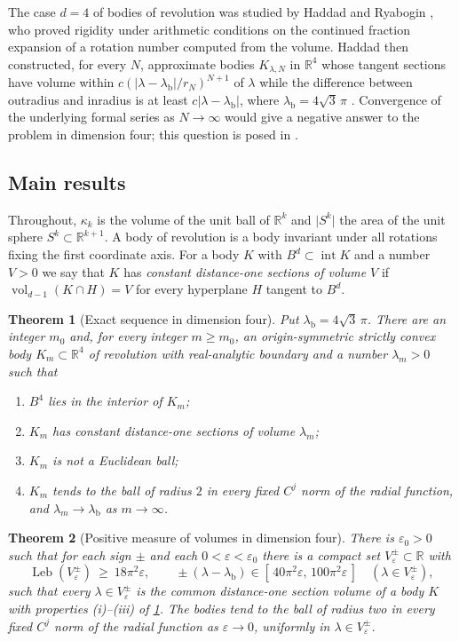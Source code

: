 \documentclass[11pt]{amsart}
\numberwithin{equation}{section}
\newtheorem{theorem}{Theorem}[section]
\theoremstyle{definition}
\theoremstyle{remark}
\newcommand{\R}{\mathbb{R}}
\newcommand{\eps}{\varepsilon}
\newcommand{\abs}[1]{\lvert #1\rvert}
\newcommand{\vol}{\operatorname{vol}}
\newcommand{\Leb}{\operatorname{Leb}}
\newcommand{\lb}{\lambda_{\mathrm b}}
\begin{document}
The case $d=4$ of bodies of revolution was studied by Haddad and Ryabogin \cite{HR}, who proved rigidity under arithmetic conditions on the continued fraction expansion of a rotation number computed from the volume. Haddad \cite{Had} then constructed, for every $N$, approximate bodies $K_{\lambda,N}$ in $\R^4$ whose tangent sections have volume within $c(\abs{\lambda-\lb}/r_N)^{N+1}$ of $\lambda$ while the difference between outradius and inradius is at least $c\abs{\lambda-\lb}$, where $\lb=4\sqrt3\,\pi$ \cite[Theorem~1]{Had}. Convergence of the underlying formal series as $N\to\infty$ would give a negative answer to the problem in dimension four; this question is posed in \cite[Section~6.1]{Had}.

\subsection{Main results}
Throughout, $\kappa_k$ is the volume of the unit ball of $\R^k$ and $\abs{S^{k}}$ the area of the unit sphere $S^k\subset\R^{k+1}$. A body of revolution is a body invariant under all rotations fixing the first coordinate axis. For a body $K$ with $B^d\subset\operatorname{int}K$ and a number $V>0$ we say that $K$ has \emph{constant distance-one sections of volume $V$} if $\vol_{d-1}(K\cap H)=V$ for every hyperplane $H$ tangent to $B^d$.

\begin{theorem}[Exact sequence in dimension four]\label{thm:d4seq}
Put $\lb=4\sqrt3\,\pi$. There are an integer $m_0$ and, for every integer $m\ge m_0$, an origin-symmetric strictly convex body $K_m\subset\R^4$ of revolution with real-analytic boundary and a number $\lambda_m>0$ such that
\begin{enumerate}[label=\textup{(\roman*)}]
\item $B^4$ lies in the interior of $K_m$;
\item $K_m$ has constant distance-one sections of volume $\lambda_m$;
\item $K_m$ is not a Euclidean ball;
\item $K_m$ tends to the ball of radius $2$ in every fixed $C^j$ norm of the radial function, and $\lambda_m\to\lb$ as $m\to\infty$.
\end{enumerate}
\end{theorem}

\begin{theorem}[Positive measure of volumes in dimension four]\label{thm:d4meas}
There is $\eps_0>0$ such that for each sign $\pm$ and each $0<\eps<\eps_0$ there is a compact set $V_\eps^{\pm}\subset\R$ with
\[
\Leb(V_\eps^{\pm})\ \ge\ 18\pi^2\eps,\qquad \pm(\lambda-\lb)\in[\,40\pi^2\eps,\,100\pi^2\eps\,]\quad(\lambda\in V_\eps^\pm),
\]
such that every $\lambda\in V_\eps^\pm$ is the common distance-one section volume of a body $K$ with properties \textup{(i)}--\textup{(iii)} of \cref{thm:d4seq}. The bodies tend to the ball of radius two in every fixed $C^j$ norm of the radial function as $\eps\to0$, uniformly in $\lambda\in V_\eps^\pm$.
\end{theorem}
\end{document}
